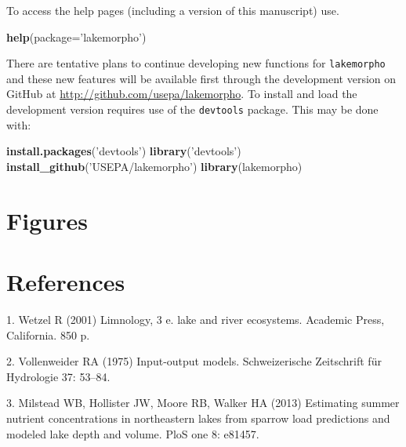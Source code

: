 \documentclass[11pt,]{article}
\newenvironment{Shaded}{\begin{snugshade}}{\end{snugshade}}
\newcommand{\KeywordTok}[1]{\textcolor[rgb]{0.13,0.29,0.53}{\textbf{{#1}}}}
\newcommand{\DataTypeTok}[1]{\textcolor[rgb]{0.13,0.29,0.53}{{#1}}}
\newcommand{\StringTok}[1]{\textcolor[rgb]{0.31,0.60,0.02}{{#1}}}
\newcommand{\NormalTok}[1]{{#1}}
\begin{document}
To access the help pages (including a version of this manuscript) use.

\begin{Shaded}
\begin{Highlighting}[]
\KeywordTok{help}\NormalTok{(}\DataTypeTok{package=}\StringTok{'lakemorpho'}\NormalTok{)}
\end{Highlighting}
\end{Shaded}

There are tentative plans to continue developing new functions for
\texttt{lakemorpho} and these new features will be available first
through the development version on GitHub at
\href{http://github.com/USEPA/lakemorpho}{http://github.com/usepa/lakemorpho}.
To install and load the development version requires use of the
\texttt{devtools} package. This may be done with:

\begin{Shaded}
\begin{Highlighting}[]
\KeywordTok{install.packages}\NormalTok{(}\StringTok{'devtools'}\NormalTok{)}
\KeywordTok{library}\NormalTok{(}\StringTok{'devtools'}\NormalTok{)}
\KeywordTok{install_github}\NormalTok{(}\StringTok{'USEPA/lakemorpho'}\NormalTok{)}
\KeywordTok{library}\NormalTok{(lakemorpho)}
\end{Highlighting}
\end{Shaded}

\section{Figures}\label{figures}

\section*{References}\label{references}

\hypertarget{refs}{}
\hypertarget{ref-wetzel2001limnology}{}
1. Wetzel R (2001) Limnology, 3 e. lake and river ecosystems. Academic
Press, California. 850 p.

\hypertarget{ref-vollenweider1975input}{}
2. Vollenweider RA (1975) Input-output models. Schweizerische
Zeitschrift für Hydrologie 37: 53--84.

\hypertarget{ref-milstead2013estimating}{}
3. Milstead WB, Hollister JW, Moore RB, Walker HA (2013) Estimating
summer nutrient concentrations in northeastern lakes from sparrow load
predictions and modeled lake depth and volume. PloS one 8: e81457.
\end{document}
